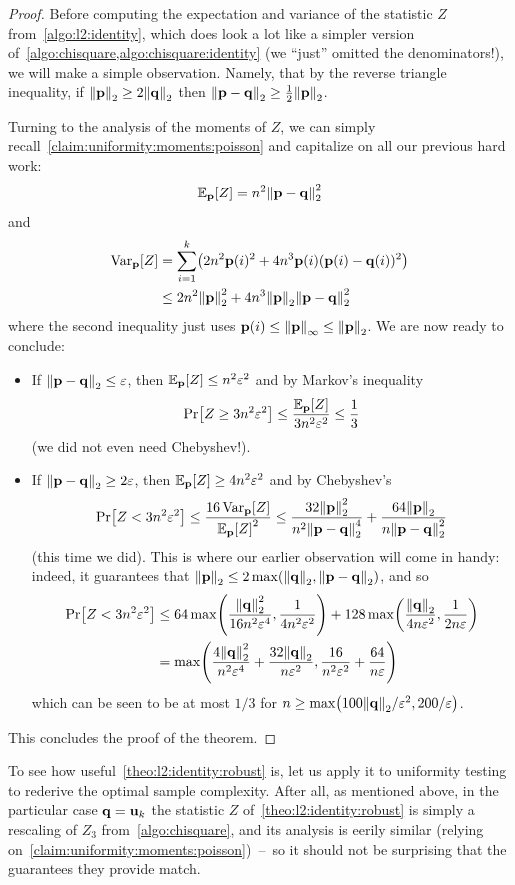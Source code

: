 \begin{proof}
Before computing the expectation and variance of the statistic $Z$ from~\cref{algo:l2:identity}, which does look a lot like a simpler version of~\cref{algo:chisquare,algo:chisquare:identity} (we ``just'' omitted the denominators!), we will make a simple observation. Namely, that by the reverse triangle inequality, if $\normtwo{\p} \geq 2\normtwo{\q}$ then $\normtwo{\p-\q} \geq \frac{1}{2}\normtwo{\p}$. 

Turning to the analysis of the moments of $Z$, we can simply recall~\cref{claim:uniformity:moments:poisson} and capitalize on all our previous hard work:
\begin{align}
	\bE{\p}{Z} = \ns^2 \normtwo{\p-\q}^2
\end{align}
and
\begin{align}
	\Var_{\p}[Z] &= \sum_{i=1}^\ab \Paren{ 2\ns^2 \p(i)^2 + 4\ns^3 \p(i)(\p(i)-\q(i))^2 } \notag \\
	&\leq 2\ns^2 \normtwo{\p}^2 + 4\ns^3 \normtwo{\p}\normtwo{\p-\q}^2
\end{align}
where the second inequality just uses $\p(i) \leq \norminf{\p} \leq \normtwo{\p}$. We are now ready to conclude:
\begin{itemize}
	\item If $\normtwo{\p-\q} \leq \dst$, then $\bE{\p}{Z} \leq \ns^2\dst^2$ and by Markov's inequality
	\[
		\bPr{Z \geq 3\ns^2\dst^2 } \leq \frac{\bE{\p}{Z}}{3\ns^2\dst^2} \leq \frac{1}{3}
	\]
	(we did not even need Chebyshev!).
	\item If $\normtwo{\p-\q} \geq 2\dst$, then $\bE{\p}{Z} \geq 4\ns^2\dst^2$ and by Chebyshev's 
	\[
		\bPr{Z < 3\ns^2\dst^2 } \leq \frac{16\Var_{\p}[Z]}{\bE{\p}{Z}^2} \leq 
		\frac{32\normtwo{\p}^2}{\ns^2\normtwo{\p-\q}^4} + \frac{64\normtwo{\p}}{\ns\normtwo{\p-\q}^2}
	\]
	(this time we did). This is where our earlier observation will come in handy: indeed, it guarantees that $\normtwo{\p} \leq 2\max\Paren{\normtwo{\q}, \normtwo{\p-\q}}$, and so
	\begin{align*}
		\bPr{Z < 3\ns^2\dst^2 } &\leq 
		64\max\Paren{\frac{\normtwo{\q}^2}{16\ns^2\dst^4},\frac{1}{4\ns^2\dst^2}} + 128\max\Paren{\frac{\normtwo{\q}}{4\ns\dst^2},\frac{1}{2\ns\dst}} \\
		&= \max\Paren{\frac{4\normtwo{\q}^2}{\ns^2\dst^4}+\frac{32\normtwo{\q}}{\ns\dst^2},\frac{16}{\ns^2\dst^2} + \frac{64}{\ns\dst}}
	\end{align*}
	which can be seen to be at most $1/3$ for $\ns \geq \max\Paren{100\normtwo{\q}/\dst^2, 200/\dst}$.
\end{itemize}
This concludes the proof of the theorem.
\end{proof}
To see how useful~\cref{theo:l2:identity:robust} is, let us apply it to uniformity testing to rederive the optimal sample complexity. After all, as mentioned above, in the particular case $\mathbf{q}=\mathbf{u}_k$ the statistic $Z$ of~\cref{theo:l2:identity:robust} is simply a rescaling of $Z_3$ from~\cref{algo:chisquare}, and its analysis is eerily similar (relying on~\cref{claim:uniformity:moments:poisson})~--~so it should not be surprising that the guarantees they provide match.

